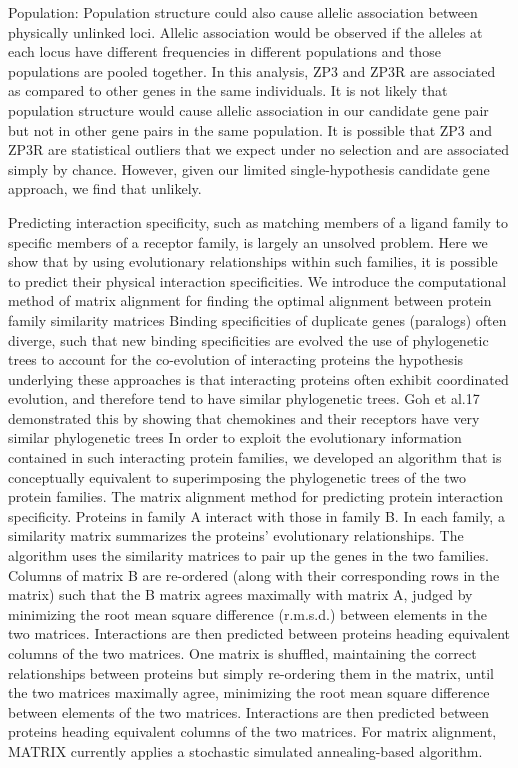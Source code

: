 Population: Population structure could also cause allelic association between physically unlinked loci.  \cite{rohlfs2010detecting}
Allelic association would be observed if the alleles at each locus have different frequencies in different populations and those populations are pooled together. In this analysis, ZP3 and ZP3R are associated as compared to other genes in the same individuals. It is not likely that population structure would cause allelic association in our candidate gene pair but not in other gene pairs in the same population. It is possible that ZP3 and ZP3R are statistical outliers that we expect under no selection and are associated simply by chance. However, given our limited single-hypothesis candidate gene approach, we find that unlikely. \cite{rohlfs2010detecting}

Predicting interaction specificity, such as matching members of a ligand family to specific members of a receptor family, is largely an unsolved problem. Here we show that by using evolutionary relationships within such families, it is possible to predict their physical interaction specificities.  \cite{ramani2003exploiting}
We introduce the computational method of matrix alignment for finding the optimal alignment between protein family similarity matrices \cite{ramani2003exploiting}
Binding specificities of duplicate genes (paralogs) often diverge, such that new binding specificities are evolved \cite{ramani2003exploiting}
the use of phylogenetic trees to account for the co-evolution of interacting proteins \cite{ramani2003exploiting}
the hypothesis underlying these approaches is that interacting proteins often exhibit coordinated evolution, and therefore tend to have similar phylogenetic trees. Goh et al.17 demonstrated this by showing that chemokines and their receptors have very similar phylogenetic trees \cite{ramani2003exploiting}
In order to exploit the evolutionary information contained in such interacting protein families, we developed an algorithm that is conceptually equivalent to superimposing the phylogenetic trees of the two protein families. \cite{ramani2003exploiting}
The matrix alignment method for predicting protein interaction specificity. Proteins in family A interact with those in family B. In each family, a similarity matrix summarizes the proteins' evolutionary relationships. The algorithm uses the similarity matrices to pair up the genes in the two families. Columns of matrix B are re-ordered (along with their corresponding rows in the matrix) such that the B matrix agrees maximally with matrix A, judged by minimizing the root mean square difference (r.m.s.d.) between elements in the two matrices. Interactions are then predicted between proteins heading equivalent columns of the two matrices. \cite{ramani2003exploiting}
One matrix is shuffled, maintaining the correct relationships between proteins but simply re-ordering them in the matrix, until the two matrices maximally agree, minimizing the root mean square difference between elements of the two matrices. Interactions are then predicted between proteins heading equivalent columns of the two matrices.  \cite{ramani2003exploiting}
For matrix alignment, MATRIX currently applies a stochastic simulated annealing-based algorithm. \cite{ramani2003exploiting}


